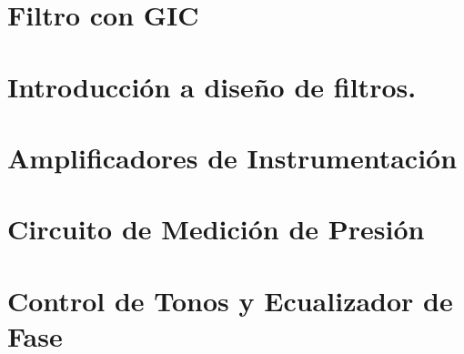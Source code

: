 







\tableofcontents
\newpage


\section{Filtro con GIC}
	
	\newpage

\section{Introducción a diseño de filtros.}
	
	\newpage
	
\section{Amplificadores de Instrumentación}
	
	\newpage
	
\section{Circuito de Medición de Presión}
	\newpage
	
\section{Control de Tonos y Ecualizador de Fase}
	
	\newpage
	
	\newpage
	
